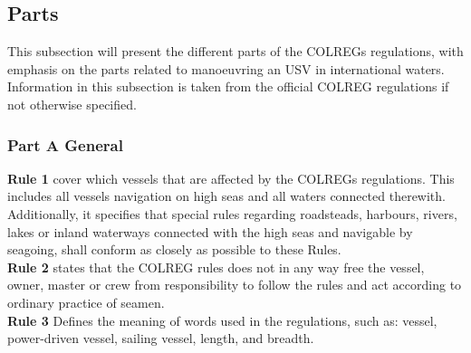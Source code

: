 \subsection{Parts}
This subsection will present the different parts of the COLREGs regulations, with emphasis on the parts related to manoeuvring an USV in international waters. Information in this subsection is taken from the official COLREG regulations  \cite{colreg} if not otherwise specified.
\subsubsection{Part A General}
\textbf{Rule 1} cover which vessels that are affected by the COLREGs regulations. This includes all vessels navigation on high seas and all waters connected therewith.
Additionally, it specifies that special rules regarding roadsteads, harbours, rivers, lakes or inland waterways connected with the high seas and navigable by seagoing, shall conform as closely as possible to these Rules.
\\
\textbf{Rule 2} states that the COLREG rules does not in any way free the vessel, owner, master or crew from responsibility to follow the rules and act according to ordinary practice of seamen.
\\
\textbf{Rule 3} Defines the meaning of words used in the regulations, such as: vessel, power-driven vessel, sailing vessel, length, and breadth.
